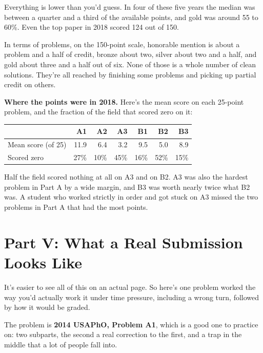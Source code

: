 \documentclass[11pt]{article}
\begin{document}
Everything is lower than you'd guess. In four of these five years the median was between a
quarter and a third of the available points, and gold was around 55 to 60\%. Even the top
paper in 2018 scored 124 out of 150.

In terms of problems, on the 150-point scale, honorable mention is about a problem and a
half of credit, bronze about two, silver about two and a half, and gold about three and a
half out of six. None of those is a whole number of clean solutions. They're all reached by
finishing some problems and picking up partial credit on others.

\begin{tipbox}
\textbf{Where the points were in 2018.} Here's the mean score on each 25-point problem, and
the fraction of the field that scored zero on it:

\begin{center}
\begin{tabular}{lrrrrrr}
\hline
& \textbf{A1} & \textbf{A2} & \textbf{A3} & \textbf{B1} & \textbf{B2} & \textbf{B3} \\
\hline
Mean score (of 25) & 11.9 & 6.4 & 3.2 & 9.5 & 5.0 & 8.9 \\
Scored zero        & 27\% & 10\% & 45\% & 16\% & 52\% & 15\% \\
\hline
\end{tabular}
\end{center}

Half the field scored nothing at all on A3 and on B2. A3 was also the hardest problem in
Part A by a wide margin, and B3 was worth nearly twice what B2 was. A student who worked
strictly in order and got stuck on A3 missed the two problems in Part A that had the most
points.
\end{tipbox}

\section{Part V: What a Real Submission Looks Like}

It's easier to see all of this on an actual page. So here's one problem worked the way
you'd actually work it under time pressure, including a wrong turn, followed by how it
would be graded.

The problem is \textbf{2014 USAPhO, Problem A1}, which is a good one to practice on: two
subparts, the second a real correction to the first, and a trap in the middle that a lot of
people fall into.
\end{document}
